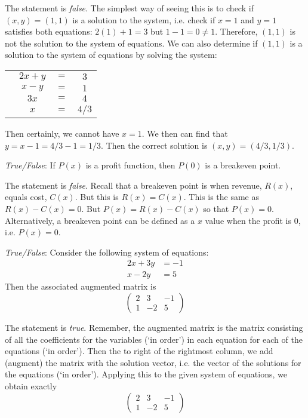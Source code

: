 \documentclass[11pt,letterpaper]{article}
\begin{document}
\sol The statement is \textit{false}. The simplest way of seeing this is to check if $(x,y)= (1,1)$ is a solution to the system, i.e. check if $x= 1$ and $y= 1$ satisfies both equations: $2(1) + 1= 3$ but $1 - 1= 0 \neq 1$. Therefore, $(1, 1)$ is not the solution to the system of equations. We can also determine if $(1, 1)$ is a solution to the system of equations by solving the system: \par
	\begin{table}[!ht]
	\centering
	\begin{tabular}{cccc}
	& $2x + y$ & $=$ & $3$ \\
	& $x - y$ & $=$ & $1$ \\ \hline
	& $3x$ & $=$ & $4$ \\
	& $x$ & $=$ & $4/3$ 
	\end{tabular}
	\end{table}
Then certainly, we cannot have $x= 1$. We then can find that $y= x - 1= 4/3 - 1= 1/3$. Then the correct solution is $(x, y)= (4/3, 1/3)$. 



\newpage



\quizsol \textit{True/False}: If $P(x)$ is a profit function, then $P(0)$ is a breakeven point. \pspace

\sol The statement is \textit{false}. Recall that a breakeven point is when revenue, $R(x)$, equals cost, $C(x)$. But this is $R(x)= C(x)$. This is the same as $R(x) - C(x)= 0$. But $P(x)= R(x) - C(x)$ so that $P(x)= 0$. Alternatively, a breakeven point can be defined as a $x$ value when the profit is 0, i.e. $P(x)= 0$. \pvspace{1.5cm}



\quizsol \textit{True/False}: Consider the following system of equations:
	\[
	\begin{aligned}
	2x + 3y&= -1 \\
	x - 2y&= 5
	\end{aligned}
	\]
Then the associated augmented matrix is 
	\[
	\begin{pmatrix}
	2 & 3 & -1 \\
	1 & -2 & 5
	\end{pmatrix}
	\]

\sol The statement is \textit{true}. Remember, the augmented matrix is the matrix consisting of all the coefficients for the variables (`in order') in each equation for each of the equations (`in order'). Then the to right of the rightmost column, we add (augment) the matrix with the solution vector, i.e. the vector of the solutions for the equations (`in order'). Applying this to the given system of equations, we obtain exactly
	\[
	\begin{pmatrix}
	2 & 3 & -1 \\
	1 & -2 & 5
	\end{pmatrix}
	\] \pvspace{1.5cm}
\end{document}
